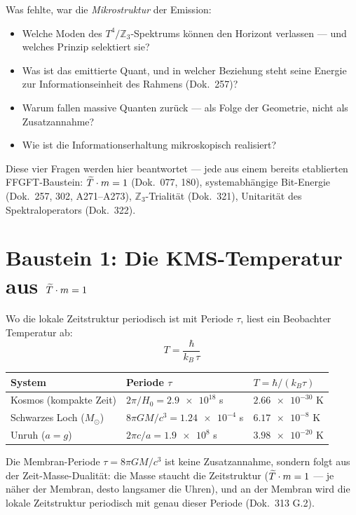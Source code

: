 Was fehlte, war die \emph{Mikrostruktur} der Emission:
\begin{itemize}
  \item Welche Moden des $T^4/\mathbb{Z}_3$-Spektrums können den
    Horizont verlassen — und welches Prinzip selektiert sie?
  \item Was ist das emittierte Quant, und in welcher Beziehung steht
    seine Energie zur Informationseinheit des Rahmens (Dok.\ 257)?
  \item Warum fallen massive Quanten zurück — als Folge der Geometrie,
    nicht als Zusatzannahme?
  \item Wie ist die Informationserhaltung mikroskopisch realisiert?
\end{itemize}
Diese vier Fragen werden hier beantwortet — jede aus einem bereits
etablierten FFGFT-Baustein: $\widetilde{T}\cdot m = 1$ (Dok.\ 077, 180),
systemabhängige Bit-Energie (Dok.\ 257, 302, A271–A273),
$\mathbb{Z}_3$-Trialität (Dok.\ 321), Unitarität des Spektraloperators
(Dok.\ 322).

\section{Baustein 1: Die KMS-Temperatur aus \texorpdfstring{$\widetilde{T}\cdot m = 1$}{T*m=1}}

Wo die lokale Zeitstruktur periodisch ist mit Periode $\tau$,
liest ein Beobachter Temperatur ab:
\begin{equation}
  T = \frac{\hbar}{k_B\,\tau}
  \label{eq:kms}
\end{equation}

\begin{center}
\small
\begin{tabular}{@{}lll@{}}
  \toprule
  System & Periode $\tau$ & $T = \hbar/(k_B\tau)$ \\
  \midrule
  Kosmos (kompakte Zeit) & $2\pi/H_0 = \num{2.9e18}$ s & $\num{2.66e-30}$ K \\
  Schwarzes Loch ($M_\odot$) & $8\pi GM/c^3 = \num{1.24e-4}$ s & $\num{6.17e-8}$ K \\
  Unruh ($a = g$) & $2\pi c/a = \num{1.9e8}$ s & $\num{3.98e-20}$ K \\
  \bottomrule
\end{tabular}
\end{center}

Die Membran-Periode $\tau = 8\pi GM/c^3$ ist keine Zusatzannahme,
sondern folgt aus der Zeit-Masse-Dualität: die Masse staucht die
Zeitstruktur ($\widetilde{T}\cdot m = 1$ — je näher der Membran, desto langsamer
die Uhren), und an der Membran wird die lokale Zeitstruktur periodisch
mit genau dieser Periode (Dok.\ 313 G.2). \K

